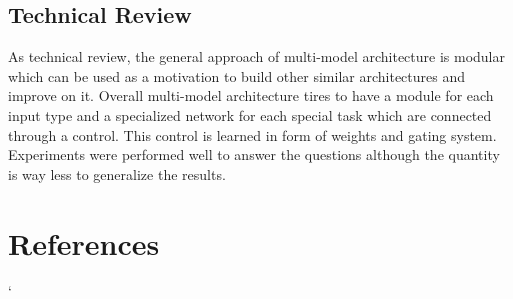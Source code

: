 \documentclass[12pt]{article}
\begin{document}
\subsection{Technical Review}
As technical review, the general approach of multi-model architecture is modular which can be used as a motivation to build other similar architectures and improve on it. Overall multi-model architecture tires to have a module for each input type and a specialized network for each special task which are connected through a control. This control is learned in form of weights and gating system. Experiments were performed well to answer the questions although the quantity is way less to generalize the results.
\newpage
\section{References}
\begingroup
\nocite{*}
\renewcommand{\section}[2]{}
`

\endgroup
\end{document}
